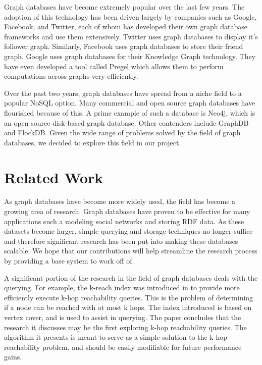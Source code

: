 \documentclass[11pt]{article}
\begin{document}
Graph databases have become extremely popular over the last few years. The adoption of this technology has been driven largely by companies such as Google, Facebook, and Twitter, each of whom has developed their own graph database frameworks and use them extensively. Twitter uses graph databases to display it’s follower graph. Similarly, Facebook uses graph databases to store their friend graph. Google uses graph databases for their Knowledge Graph \cite{kgraph} technology. They have even developed a tool called Pregel\cite{pregel} which allows them to perform computations across graphs very efficiently.

Over the past two years, graph databases have spread from a niche field to a popular NoSQL option. Many commercial and open source graph databases have flourished because of this. A prime example of such a database is Neo4j\cite{neo}, which is an open source disk-based graph database. Other contenders include GraphDB\cite{graphdb} and FlockDB\cite{flock}. Given the wide range of problems solved by the field of graph databases, we decided to explore this field in our project.

\section{Related Work}

As graph databases have become more widely used, the field has become a growing area of research.  Graph databases have proven to be effective for many applications such a modeling social networks and storing RDF data.  As these datasets become larger, simple querying and storage techniques no longer suffice and therefore significant research has been put into making these databases scalable.  We hope that our contributions will help streamline the research process by providing a base system to work off of.

	A significant portion of the research in the field of graph databases deals with the querying. For example, the k-reach index was introduced in \cite{Cheng} to provide more efficiently execute k-hop reachability queries.  This is the problem of determining if a node can be reached with at most k hops.  The index introduced is based on vertex cover, and is used to assist in querying. The paper concludes that the research it discusses may be the first exploring k-hop reachability queries. The algorithm it presents is meant to serve as a simple solution to the k-hop reachability problem, and should be easily modifiable for future performance gains.
\end{document}
